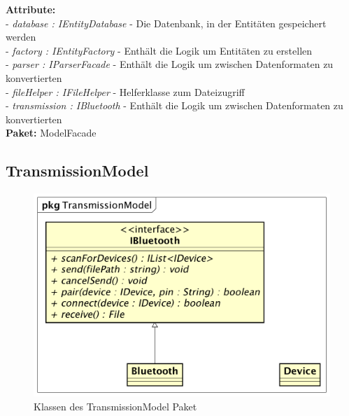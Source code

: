 \documentclass[a4paper]{scrreprt}
\begin{document}
\textbf{Attribute:}\\
- \textit{database : IEntityDatabase} - Die Datenbank, in der Entitäten gespeichert werden\\
- \textit{factory : IEntityFactory} - Enthält die Logik um Entitäten zu erstellen\\
- \textit{parser : IParserFacade} - Enthält die Logik um zwischen Datenformaten zu konvertierten\\
- \textit{fileHelper : IFileHelper} - Helferklasse zum Dateizugriff\\
- \textit{transmission : IBluetooth} - Enthält die Logik um zwischen Datenformaten zu konvertierten\\

\textbf{Paket:} ModelFacade

\subsection{TransmissionModel}
\begin{figure}[H]
\centering
\includegraphics[width=0.75\textheight]{graphics/Klassendiagramme/Model/TransmissionModelPackage.png}
\caption{Klassen des TransmissionModel Paket}
\end{figure}
\end{document}
